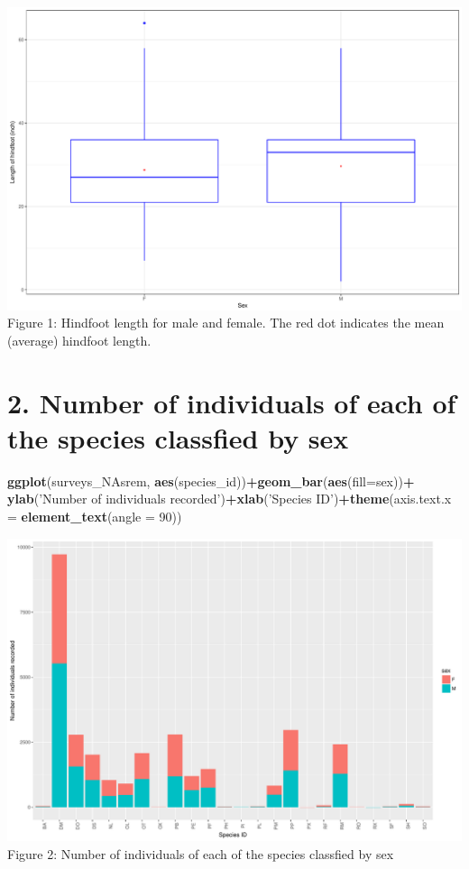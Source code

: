 \documentclass[]{article}
\newenvironment{Shaded}{\begin{snugshade}}{\end{snugshade}}
\newcommand{\KeywordTok}[1]{\textcolor[rgb]{0.13,0.29,0.53}{\textbf{#1}}}
\newcommand{\DataTypeTok}[1]{\textcolor[rgb]{0.13,0.29,0.53}{#1}}
\newcommand{\DecValTok}[1]{\textcolor[rgb]{0.00,0.00,0.81}{#1}}
\newcommand{\StringTok}[1]{\textcolor[rgb]{0.31,0.60,0.02}{#1}}
\newcommand{\OperatorTok}[1]{\textcolor[rgb]{0.81,0.36,0.00}{\textbf{#1}}}
\newcommand{\NormalTok}[1]{#1}
\begin{document}
\includegraphics{figs/relationship between sex and hindfoot length boxplot-1.pdf}
Figure 1: Hindfoot length for male and female. The red dot indicates the
mean (average) hindfoot length.

\section{2. Number of individuals of each of the species classfied by
sex}\label{number-of-individuals-of-each-of-the-species-classfied-by-sex}

\begin{Shaded}
\begin{Highlighting}[]
\KeywordTok{ggplot}\NormalTok{(surveys_NAsrem, }\KeywordTok{aes}\NormalTok{(species_id))}\OperatorTok{+}\KeywordTok{geom_bar}\NormalTok{(}\KeywordTok{aes}\NormalTok{(}\DataTypeTok{fill=}\NormalTok{sex))}\OperatorTok{+}
\StringTok{  }\KeywordTok{ylab}\NormalTok{(}\StringTok{'Number of individuals recorded'}\NormalTok{)}\OperatorTok{+}\KeywordTok{xlab}\NormalTok{(}\StringTok{'Species ID'}\NormalTok{)}\OperatorTok{+}\KeywordTok{theme}\NormalTok{(}\DataTypeTok{axis.text.x =} \KeywordTok{element_text}\NormalTok{(}\DataTypeTok{angle =} \DecValTok{90}\NormalTok{)) }
\end{Highlighting}
\end{Shaded}

\includegraphics{figs/Individuals_per_species_sex-1.pdf} Figure 2:
Number of individuals of each of the species classfied by sex
\end{document}
